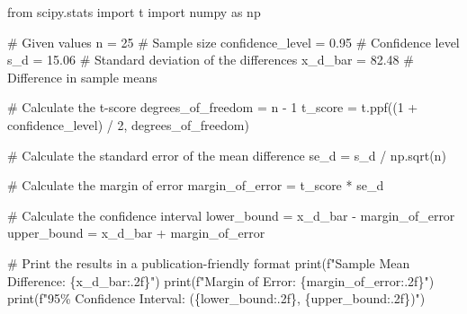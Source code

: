 \documentclass[
  letterpaper,
  DIV=11,
  numbers=noendperiod]{scrartcl}
\newenvironment{Shaded}{\begin{snugshade}}{\end{snugshade}}
\newcommand{\BuiltInTok}[1]{\textcolor[rgb]{0.00,0.23,0.31}{#1}}
\newcommand{\CommentTok}[1]{\textcolor[rgb]{0.37,0.37,0.37}{#1}}
\newcommand{\DecValTok}[1]{\textcolor[rgb]{0.68,0.00,0.00}{#1}}
\newcommand{\FloatTok}[1]{\textcolor[rgb]{0.68,0.00,0.00}{#1}}
\newcommand{\ImportTok}[1]{\textcolor[rgb]{0.00,0.46,0.62}{#1}}
\newcommand{\NormalTok}[1]{\textcolor[rgb]{0.00,0.23,0.31}{#1}}
\newcommand{\OperatorTok}[1]{\textcolor[rgb]{0.37,0.37,0.37}{#1}}
\newcommand{\SpecialCharTok}[1]{\textcolor[rgb]{0.37,0.37,0.37}{#1}}
\newcommand{\SpecialStringTok}[1]{\textcolor[rgb]{0.13,0.47,0.30}{#1}}
\begin{document}
\begin{Shaded}
\begin{Highlighting}[]
\ImportTok{from}\NormalTok{ scipy.stats }\ImportTok{import}\NormalTok{ t}
\ImportTok{import}\NormalTok{ numpy }\ImportTok{as}\NormalTok{ np}

\CommentTok{\# Given values}
\NormalTok{n }\OperatorTok{=} \DecValTok{25}  \CommentTok{\# Sample size}
\NormalTok{confidence\_level }\OperatorTok{=} \FloatTok{0.95}  \CommentTok{\# Confidence level}
\NormalTok{s\_d }\OperatorTok{=} \FloatTok{15.06}  \CommentTok{\# Standard deviation of the differences}
\NormalTok{x\_d\_bar }\OperatorTok{=} \FloatTok{82.48}  \CommentTok{\# Difference in sample means}

\CommentTok{\# Calculate the t{-}score}
\NormalTok{degrees\_of\_freedom }\OperatorTok{=}\NormalTok{ n }\OperatorTok{{-}} \DecValTok{1}
\NormalTok{t\_score }\OperatorTok{=}\NormalTok{ t.ppf((}\DecValTok{1} \OperatorTok{+}\NormalTok{ confidence\_level) }\OperatorTok{/} \DecValTok{2}\NormalTok{, degrees\_of\_freedom)}

\CommentTok{\# Calculate the standard error of the mean difference}
\NormalTok{se\_d }\OperatorTok{=}\NormalTok{ s\_d }\OperatorTok{/}\NormalTok{ np.sqrt(n)}

\CommentTok{\# Calculate the margin of error}
\NormalTok{margin\_of\_error }\OperatorTok{=}\NormalTok{ t\_score }\OperatorTok{*}\NormalTok{ se\_d}

\CommentTok{\# Calculate the confidence interval}
\NormalTok{lower\_bound }\OperatorTok{=}\NormalTok{ x\_d\_bar }\OperatorTok{{-}}\NormalTok{ margin\_of\_error}
\NormalTok{upper\_bound }\OperatorTok{=}\NormalTok{ x\_d\_bar }\OperatorTok{+}\NormalTok{ margin\_of\_error}

\CommentTok{\# Print the results in a publication{-}friendly format}
\BuiltInTok{print}\NormalTok{(}\SpecialStringTok{f"Sample Mean Difference: }\SpecialCharTok{\{}\NormalTok{x\_d\_bar}\SpecialCharTok{:.2f\}}\SpecialStringTok{"}\NormalTok{)}
\BuiltInTok{print}\NormalTok{(}\SpecialStringTok{f"Margin of Error: }\SpecialCharTok{\{}\NormalTok{margin\_of\_error}\SpecialCharTok{:.2f\}}\SpecialStringTok{"}\NormalTok{)}
\BuiltInTok{print}\NormalTok{(}\SpecialStringTok{f"95\% Confidence Interval: (}\SpecialCharTok{\{}\NormalTok{lower\_bound}\SpecialCharTok{:.2f\}}\SpecialStringTok{, }\SpecialCharTok{\{}\NormalTok{upper\_bound}\SpecialCharTok{:.2f\}}\SpecialStringTok{)"}\NormalTok{)}
\end{Highlighting}
\end{Shaded}
\end{document}
